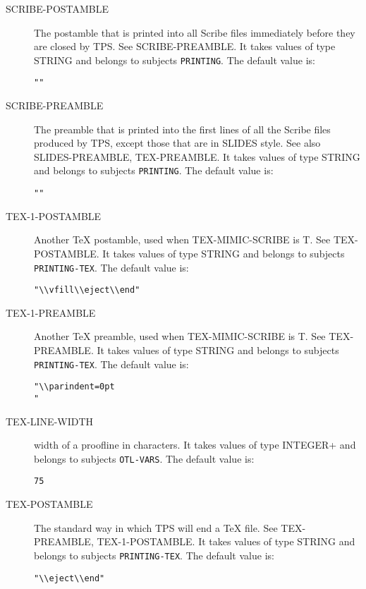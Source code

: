 \begin{description}
\item[SCRIBE-POSTAMBLE]  
The postamble that is printed into all Scribe files
immediately before they are closed by TPS. See SCRIBE-PREAMBLE.
It takes values of type STRING and belongs to subjects \texttt{PRINTING}.  The default value is: \begin{lstlisting}
""
\end{lstlisting}

\item[SCRIBE-PREAMBLE]  
The preamble that is printed into the first lines of all 
the Scribe files produced by TPS, except those that are in SLIDES
style. See also SLIDES-PREAMBLE, TEX-PREAMBLE.
It takes values of type STRING and belongs to subjects \texttt{PRINTING}.  The default value is: \begin{lstlisting}
""
\end{lstlisting}

\item[TEX-1-POSTAMBLE]  
Another TeX postamble, used when TEX-MIMIC-SCRIBE is T.
See TEX-POSTAMBLE.
It takes values of type STRING and belongs to subjects \texttt{PRINTING-TEX}.  The default value is: \begin{lstlisting}
"\\vfill\\eject\\end"
\end{lstlisting}

\item[TEX-1-PREAMBLE]  
Another TeX preamble, used when TEX-MIMIC-SCRIBE is T. 
See TEX-PREAMBLE.
It takes values of type STRING and belongs to subjects \texttt{PRINTING-TEX}.  The default value is: \begin{lstlisting}
"\\parindent=0pt
"
\end{lstlisting}

\item[TEX-LINE-WIDTH]  
width of a proofline in characters.
It takes values of type INTEGER+ and belongs to subjects \texttt{OTL-VARS}.  The default value is: \begin{lstlisting}
75
\end{lstlisting}

\item[TEX-POSTAMBLE]  
The standard way in which TPS will end a TeX file.
See TEX-PREAMBLE, TEX-1-POSTAMBLE.
It takes values of type STRING and belongs to subjects \texttt{PRINTING-TEX}.  The default value is: \begin{lstlisting}
"\\eject\\end"
\end{lstlisting}


\end{description}

